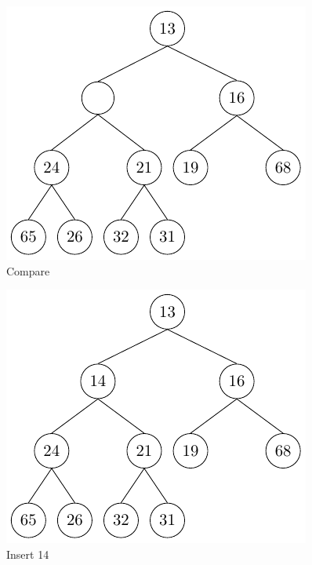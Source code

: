 \begin{center}
\begin{minipage}{0.33\textwidth}
\begin{figure}[H]
  \centering
  \includegraphics[width=\textwidth]{Figure/HeapI3.pdf}
  \caption{Compare}
\end{figure}
\end{minipage}
\begin{minipage}{0.33\textwidth}
\begin{figure}[H]
  \centering
  \includegraphics[width=\textwidth]{Figure/HeapI4.pdf}
  \caption{Insert 14}
\end{figure}
\end{minipage}
\end{center}

